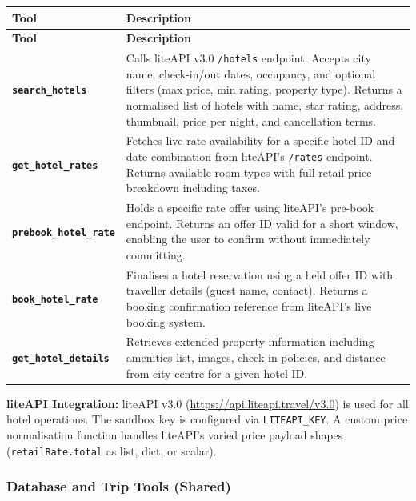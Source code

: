 \documentclass[12pt, a4paper]{article}
\newcommand{\tool}[1]{\texttt{\textbf{#1}}}
\begin{document}
\begin{longtable}{|p{4.2cm}|p{9.5cm}|}
  \hline
  \textbf{Tool} & \textbf{Description} \\
  \hline
  \endfirsthead
  \hline
  \textbf{Tool} & \textbf{Description} \\
  \hline
  \endhead
  \tool{search\_hotels} & Calls liteAPI v3.0 \texttt{/hotels} endpoint. Accepts city name, check-in/out dates, occupancy, and optional filters (max price, min rating, property type). Returns a normalised list of hotels with name, star rating, address, thumbnail, price per night, and cancellation terms. \\
  \hline
  \tool{get\_hotel\_rates} & Fetches live rate availability for a specific hotel ID and date combination from liteAPI's \texttt{/rates} endpoint. Returns available room types with full retail price breakdown including taxes. \\
  \hline
  \tool{prebook\_hotel\_rate} & Holds a specific rate offer using liteAPI's pre-book endpoint. Returns an offer ID valid for a short window, enabling the user to confirm without immediately committing. \\
  \hline
  \tool{book\_hotel\_rate} & Finalises a hotel reservation using a held offer ID with traveller details (guest name, contact). Returns a booking confirmation reference from liteAPI's live booking system. \\
  \hline
  \tool{get\_hotel\_details} & Retrieves extended property information including amenities list, images, check-in policies, and distance from city centre for a given hotel ID. \\
  \hline
\end{longtable}

\textbf{liteAPI Integration:} liteAPI v3.0 (\url{https://api.liteapi.travel/v3.0}) is used for all hotel operations. The sandbox key is configured via \texttt{LITEAPI\_KEY}. A custom price normalisation function handles liteAPI's varied price payload shapes (\texttt{retailRate.total} as list, dict, or scalar).

\subsubsection{Database and Trip Tools (Shared)}
\end{document}
